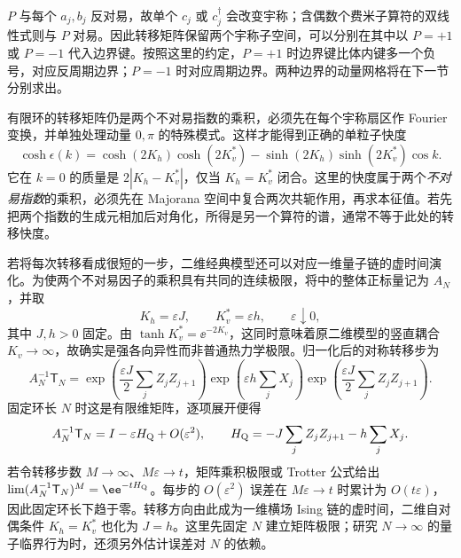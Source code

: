 \(P\) 与每个 \(a_j,b_j\) 反对易，故单个 \(c_j\) 或 \(c_j^\dagger\) 会改变宇称；含偶数个费米子算符的双线性式则与 $P$ 对易。因此转移矩阵保留两个宇称子空间，可以分别在其中以 $P=+1$ 或 $P=-1$ 代入边界键。按照这里的约定，$P=+1$ 时边界键比体内键多一个负号，对应反周期边界；$P=-1$ 时对应周期边界。两种边界的动量网格将在下一节分别求出。

有限环的转移矩阵仍是两个不对易指数的乘积，必须先在每个宇称扇区作 Fourier 变换，并单独处理动量 \(0,\pi\) 的特殊模式。这样才能得到正确的单粒子快度
\begin{equation}
\cosh\epsilon(k)=
\cosh(2K_h)\cosh(2K_v^*)
-\sinh(2K_h)\sinh(2K_v^*)\cos k.
\label{eq:phys-sm-fermion-dispersion}
\end{equation}
它在 \(k=0\) 的质量是 \(2|K_h-K_v^*|\)，仅当 \(K_h=K_v^*\) 闭合。这里的快度属于两个\emph{不对易指数}的乘积，必须先在 Majorana 空间中复合两次共轭作用，再求本征值。若先把两个指数的生成元相加后对角化，所得是另一个算符的谱，通常不等于此处的转移快度。

若将每次转移看成很短的一步，二维经典模型还可以对应一维量子链的虚时间演化。为使两个不对易因子的乘积具有共同的连续极限，将中的整体正标量记为 $A_N$，并取
\[
K_h=\varepsilon J,\qquad K_v^*=\varepsilon h,
\qquad \varepsilon\downarrow0,
\]
其中 $J,h>0$ 固定。由 $\tanh K_v^*=\ee^{-2K_v}$，这同时意味着原二维模型的竖直耦合 $K_v\to\infty$，故确实是强各向异性而非普通热力学极限。归一化后的对称转移步为
\[
A_N^{-1}\mathsf T_N
=\exp\!\left(\frac{\varepsilon J}{2}\sum_jZ_jZ_{j+1}\right)
 \exp\!\left(\varepsilon h\sum_jX_j\right)
 \exp\!\left(\frac{\varepsilon J}{2}\sum_jZ_jZ_{j+1}\right).
\]
固定环长 $N$ 时这是有限维矩阵，逐项展开便得
\[
A_N^{-1}\mathsf T_N=I-\varepsilon H_{\rm Q}+O(\varepsilon^2),
\qquad
H_{\rm Q}=-J\sum_jZ_jZ_{j+1}-h\sum_jX_j.
\]
若令转移步数 $M\to\infty$、$M\varepsilon\to t$，矩阵乘积极限或 Trotter 公式给出
$\lim(A_N^{-1}\mathsf T_N)^M=\ee^{-tH_{\rm Q}}$。每步的 $O(\varepsilon^2)$ 误差在 $M\varepsilon\to t$ 时累计为 $O(t\varepsilon)$，因此固定环长下趋于零。转移方向由此成为一维横场 Ising 链的虚时间，二维自对偶条件 $K_h=K_v^*$ 也化为 $J=h$。这里先固定 $N$ 建立矩阵极限；研究 $N\to\infty$ 的量子临界行为时，还须另外估计误差对 $N$ 的依赖。
